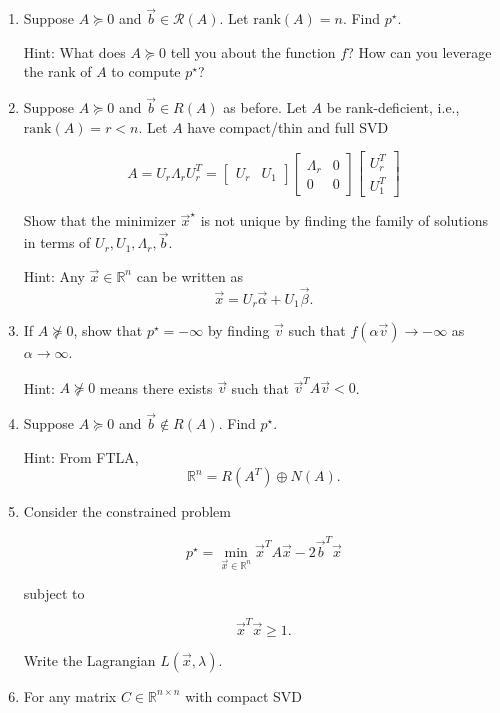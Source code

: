 \documentclass[
	12pt,
]{fphw}
\begin{document}
\begin{enumerate}
\item[(a)] Suppose $A\succeq 0$ and $\vec{b}\in \mathcal{R}(A)$. Let $\mathrm{rank}(A)=n$. Find $p^\star$.

Hint: What does $A\succeq0$ tell you about the function $f$? How can you leverage the rank of $A$ to compute $p^\star$?

\item[(b)] Suppose $A\succeq0$ and $\vec{b}\in R(A)$ as before. Let $A$ be rank-deficient, i.e., $\mathrm{rank}(A)=r<n$. Let $A$ have compact/thin and full SVD

\[
A = U_r\Lambda_rU_r^T =
\begin{bmatrix}
U_r & U_1
\end{bmatrix}
\begin{bmatrix}
\Lambda_r & 0 \\
0 & 0
\end{bmatrix}
\begin{bmatrix}
U_r^T \\
U_1^T
\end{bmatrix}
\]

Show that the minimizer $\vec{x}^\star$ is not unique by finding the family of solutions in terms of $U_r, U_1, \Lambda_r, \vec{b}$.

Hint: Any $\vec{x}\in\mathbb{R}^n$ can be written as
\[
\vec{x}=U_r\vec{\alpha}+U_1\vec{\beta}.
\]

\item[(c)] If $A\not\succeq0$, show that $p^\star=-\infty$ by finding $\vec{v}$ such that $f(\alpha\vec{v})\to -\infty$ as $\alpha\to\infty$.

Hint: $A\not\succeq0$ means there exists $\vec{v}$ such that $\vec{v}^TA\vec{v}<0$.

\item[(d)] Suppose $A\succeq0$ and $\vec{b}\notin R(A)$. Find $p^\star$.

Hint: From FTLA,
\[
\mathbb{R}^n = R(A^T) \oplus N(A).
\]

\item[(e)] Consider the constrained problem

\[
p^\star = \min_{\vec{x}\in\mathbb{R}^n} \vec{x}^T A \vec{x} - 2\vec{b}^T \vec{x}
\]

subject to

\[
\vec{x}^T\vec{x} \ge 1.
\]

Write the Lagrangian $L(\vec{x},\lambda)$.

\item[(f)] For any matrix $C\in\mathbb{R}^{n\times n}$ with compact SVD


\end{enumerate}
\end{document}
